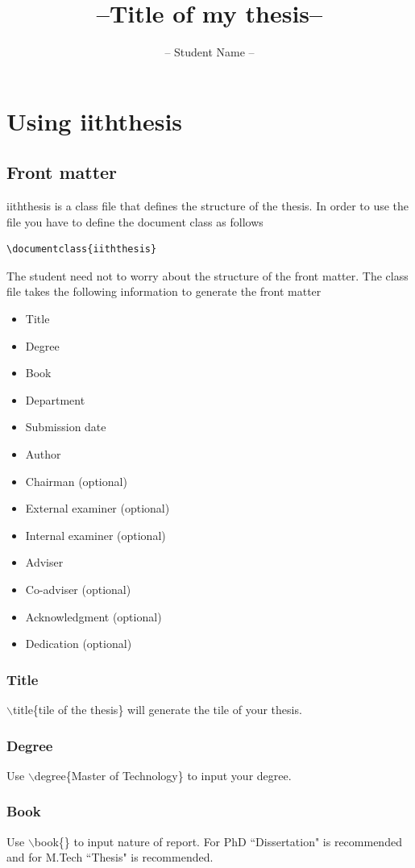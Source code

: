 \documentclass[a4paper,twoside]{iiththesis}
\title{--Title of my thesis--}
\author{-- Student Name --}
\begin{document}
\chapter{Using iiththesis}
\section{Front matter}
iiththesis is a class file that defines the structure of the thesis. In order to use the file you have to define the
document class as follows
\begin{verbatim}
\documentclass{iiththesis}
\end{verbatim}
The student need not to worry about the structure of the front matter. The class file takes the following information to generate the front matter
\begin{itemize}
\item Title
\item Degree
\item Book
\item Department
\item Submission date
\item Author
\item Chairman (optional)
\item External examiner (optional)
\item Internal examiner  (optional)
\item Adviser
\item Co-adviser (optional)
\item Acknowledgment (optional)
\item Dedication (optional)

\end{itemize}
\subsection{Title}
$ \backslash $title\{tile of the thesis\} will generate the tile of your thesis.

\subsection{Degree}
Use $ \backslash $degree\{Master of Technology\} to input your degree.

\subsection{Book}
Use $ \backslash $book\{\} to input nature of report. For PhD ``Dissertation" is recommended and
for M.Tech ``Thesis" is recommended.
\end{document}
